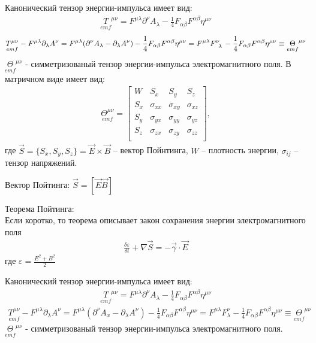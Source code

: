 \documentclass[__main__.tex]{subfiles}
\begin{document}
Канонический тензор энергии-импульса имеет вид:
\begin{gather*}
\underset{emf}{T}^{\mu\nu} = F^{\mu\lambda}\partial^\nu A_\lambda - \frac{1}{4}F_{\alpha\beta}F^{\alpha\beta}\eta^{\mu\nu}
\end{gather*}
\begin{gather*}
\underset{emf}{T^{\mu\nu}}
-
F^{\mu\lambda}\partial_\lambda A^\nu
=
F^{\mu\lambda}(\partial^\nu A_\lambda
-
\partial_\lambda A^\nu)
-
\frac{1}{4}F_{\alpha\beta}F^{\alpha\beta}\eta^{\mu\nu}
=
F^{\mu\lambda}F\indices{^\nu_\lambda}
-
\frac{1}{4}F_{\alpha\beta}F^{\alpha\beta}\eta^{\mu\nu}
\equiv
\underset{emf}{\Theta}^{\mu\nu}
\end{gather*}
$\underset{emf}{\Theta}^{\mu\nu}$ - симметризованый тензор энергии-импульса электромагнитного поля. В матричном виде имеет вид:
\begin{gather*}
\underset{emf}{\Theta^{\mu\nu}} =
\left[
\begin{array}{cccc}
W   & S_x         & S_y         & S_z         \\
S_x & \sigma_{xx} & \sigma_{xy} & \sigma_{xz} \\
S_y & \sigma_{yx} & \sigma_{yy} & \sigma_{yz} \\
S_z & \sigma_{zx} & \sigma_{zy} & \sigma_{zz} \\
\end{array}
\right],
\end{gather*}
где $\vec{S}=\{S_x,S_y,S_z\}=\vec{E}\times\vec{B}$ -- вектор Пойнтинга, $W$ -- плотность энергии, $\sigma_{ij}$ -- тензор напряжений.

\begin{definition}
	Вектор Пойтинга: $\vec{S} = [\vec{E} \vec{B}]$ 
\end{definition}

\begin{theorem}
	Теорема Пойтинга:\\
	Если коротко, то теорема описывает закон сохранения энергии электромагнитного поля
	\begin{gather*}
	\frac{\delta\varepsilon}{\delta t}+\nabla\vec{S} = -\vec{\gamma}\cdot\vec{E}
	\end{gather*}
	где $\varepsilon = \frac{E^2+B^2}{2}$
\end{theorem}
Канонический тензор энергии-импульса имеет вид:
\begin{gather*}
\underset{emf}{T}^{\mu\nu} = F^{\mu\lambda}\partial^\nu A_\lambda - \frac{1}{4}F_{\alpha\beta}F^{\alpha\beta}\eta^{\mu\nu}
\end{gather*}
\begin{gather*}
\underset{emf}{T^{\mu\nu}} - F^{\mu\lambda}\partial_\lambda A^\nu = F^{\mu\lambda}(\partial^\nu A_x - \partial_\lambda A^\nu) - \frac{1}{4}F_{\alpha\beta}F^{\alpha\beta}\eta^{\mu\nu} = F^{\mu\lambda}F^\nu_\lambda - \frac{1}{4}F_{\alpha\beta}F^{\alpha\beta}\eta^{\mu\nu}\equiv \underset{emf}{\Theta}^{\mu\nu}
\end{gather*}
$\underset{emf}{\Theta}^{\mu\nu}$ - симметризованый тензор энергии-импульса электромагнитного поля.\\
\end{document}
